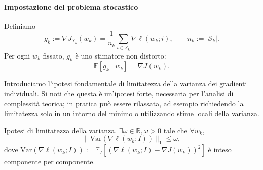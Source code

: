 \documentclass[a4paper,12pt]{article}
\numberwithin{equation}{section}
\numberwithin{figure}{section}
\numberwithin{table}{section}
\begin{document}
\paragraph{Impostazione del problema stocastico}

Definiamo
\[
g_k := \nabla J_{\mathcal{S}_k}(w_k) = \frac{1}{n_k}\sum_{i\in \mathcal{S}_k}\nabla \ell(w_k;i), \qquad n_k := |\mathcal{S}_k|. \tag{5.2}\label{eq:5_2}
\]
Per ogni \(w_k\) fissato, \(g_k\) è uno stimatore non distorto:
\[
\mathbb{E}[g_k \mid w_k] = \nabla J(w_k). \tag{5.3}\label{eq:5_3}
\]

Introduciamo l'ipotesi fondamentale di limitatezza della varianza dei gradienti individuali. Si noti che questa \`e un'ipotesi forte, necessaria per l'analisi di complessit\`a teorica; in pratica pu\`o essere rilassata, ad esempio richiedendo la limitatezza solo in un intorno del minimo o utilizzando stime locali della varianza.

\begin{notebox}
  Ipotesi di limitatezza della varianza.
   \(\exists \omega \in \mathbb{R},\omega > 0\) tale che \(\forall w_k\),
  \[
  \|\mathrm{Var}(\nabla \ell(w_k;I))\|_1 \le \omega, \tag{5.4}\label{eq:var_bound}
  \]
  dove \(\mathrm{Var}(\nabla \ell(w_k;I)) := \mathbb{E}_I[(\nabla \ell(w_k;I) - \nabla J(w_k))^2]\) è inteso componente per componente.
\end{notebox}
\end{document}

